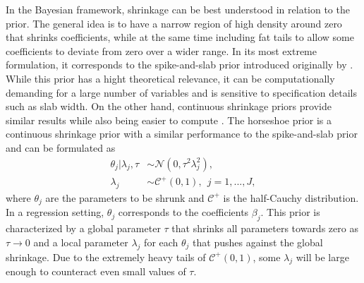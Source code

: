 In the Bayesian framework, shrinkage can be best understood in relation to the prior.
The general idea is to have a narrow region of high density around zero that shrinks coefficients,
while at the same time including fat tails to allow some coefficients to deviate from zero over a wider range.
In its most extreme formulation, it corresponds to the spike-and-slab prior introduced originally by \cite{mitchell_bayesian_1988}.
While this prior has a hight theoretical relevance, it can be computationally demanding for a large number of variables and is sensitive to specification details such as slab width.
On the other hand, continuous shrinkage priors provide similar results while also being easier to compute \citep{piironen_sparsity_2017}.
The horseshoe prior \citep{carvalho_horseshoe_2010} is a continuous shrinkage prior with a similar performance to the spike-and-slab prior and can be formulated as
\begin{equation}
    \begin{split}
        \theta_j | \lambda_j, \tau & \sim \mathcal N (0, \tau^2\lambda^2_j), \\
        \lambda_j & \sim \mathcal C^+ (0, 1), ~~ j = 1,..., J,
    \end{split}
    \label{eq_hs}
\end{equation}
where $\theta_j$ are the parameters to be shrunk and $\mathcal C^+$ is the half-Cauchy distribution. In a regression setting, $\theta_j$ corresponds to the coefficients $\beta_j$.
This prior is characterized by a global parameter $\tau$ that shrinks all parameters towards zero as $\tau \rightarrow 0$ and a local parameter $\lambda_j$ for each $\theta_j$ that pushes against the global shrinkage.
Due to the extremely heavy tails of $\mathcal C^+(0, 1)$, some $\lambda_j$ will be large enough to counteract even small values of $\tau$.

